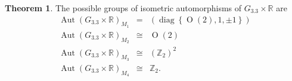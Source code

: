\documentclass[12pt,a4paper,twoside]{article}
\theoremstyle{definition}
\newtheorem{theorem}{Theorem}[section]
\begin{document}
\begin{theorem} 
The possible groups of isometric automorphisms of $G_{3.3} \times \mathbb{R}$ are
\begin{eqnarray*}
\operatorname{Aut}\left(G_{3.3} \times \mathbb{R}\right)_{M_1}  &=& \left(\operatorname{diag}\left\lbrace \operatorname{O}(2), 1, \pm1\right\rbrace \right)\\
\operatorname{Aut}\left(G_{3.3} \times \mathbb{R}\right)_{M_2}  &\cong& \operatorname{O}(2)\\
\operatorname{Aut}\left(G_{3.3} \times \mathbb{R}\right)_{M_3}  &\cong& \left(\mathbb{Z}_2\right)^2\\
\operatorname{Aut}\left(G_{3.3} \times \mathbb{R}\right)_{M_4}  &\cong& \mathbb{Z}_2.
\end{eqnarray*}
\end{theorem}
\end{document}
